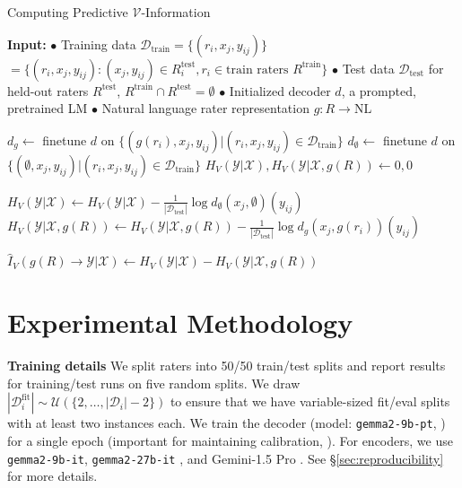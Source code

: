 \documentclass[11pt]{article}
\begin{document}
\begin{algorithm}[H]
\begin{algorithmic}[0]
\caption{Computing Predictive $\mathcal{V}$-Information}
\small
\label{alg:pred-info}
\State \textbf{Input:}
\State $\bullet$ Training data $\mathcal{D}_\text{train} = \{(r_i, x_j, y_{ij})\}$
$= \{(r_i,x_j,y_{ij}): (x_j,y_{ij}) \in R_i^\text{test}, r_i \in \text{train raters } R^\text{train}\}$
\State $\bullet$ Test data $\mathcal{D}_\text{test}$ for held-out raters $R^\text{test}$, $R^\text{train} \cap R^\text{test} = \emptyset$
\State $\bullet$ Initialized decoder $d$, a prompted, pretrained LM
\State $\bullet$ Natural language rater representation $g: R \to \text{NL}$

\medskip
\State $d_g \gets$ finetune $d$ on $\{(g(r_i), x_j, y_{ij}) | (r_i,x_j,y_{ij}) \in \mathcal{D}_\text{train}\}$
\State $d_\emptyset \gets$ finetune $d$ on $\{(\emptyset, x_j, y_{ij}) | (r_i,x_j,y_{ij}) \in \mathcal{D}_\text{train}\}$
\State $H_V(\mathcal{Y}|\mathcal{X}), H_V(\mathcal{Y}|\mathcal{X},g(R)) \gets 0, 0$

\State $H_V(\mathcal{Y}|\mathcal{X}) \gets H_V(\mathcal{Y}|\mathcal{X}) - \frac{1}{|\mathcal{D}_\text{test}|} \log d_\emptyset(x_j, \emptyset)(y_{ij})$
\State $H_V(\mathcal{Y}|\mathcal{X},g(R)) \gets H_V(\mathcal{Y}|\mathcal{X},g(R)) - \frac{1}{|\mathcal{D}_\text{test}|} \log d_g(x_j, g(r_i))(y_{ij})$
\EndFor

\State $\hat{I}_V(g(R) \to \mathcal{Y}|\mathcal{X}) \gets H_V(\mathcal{Y}|\mathcal{X}) - H_V(\mathcal{Y}|\mathcal{X},g(R))$
\end{algorithmic}
\end{algorithm}
\vspace{-10pt}


\section{Experimental Methodology}
\label{sec:experimental methodology}

\textbf{Training details }
We split raters into 50/50 train/test splits and report results for training/test runs on five random splits. We draw $|\mathcal{D}_i^{\text{fit}}| \sim \mathcal{U}(\{2,\ldots,|\mathcal{D}_i|-2\})$ to ensure that we have variable-sized fit/eval splits with at least two instances each. We train the decoder (model: \texttt{gemma2-9b-pt}, \citealt{gemmateam2024gemma2improvingopen}) for a single epoch (important for maintaining calibration, \citealt{ji2021earlystoppedneuralnetworksconsistent}).  For encoders, we use \texttt{gemma2-9b-it}, \texttt{gemma2-27b-it} \citep{gemmateam2024gemma2improvingopen}, and Gemini-1.5 Pro \citep{geminiteam2024gemini15unlockingmultimodal}. See \S \ref{sec:reproducibility} for more details.
\end{document}
